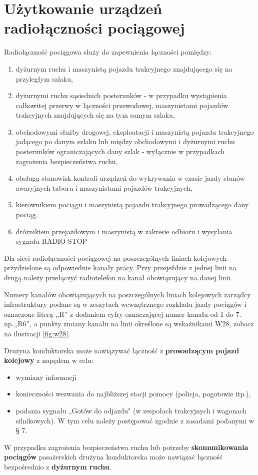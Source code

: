 \chapter{Użytkowanie urządzeń radiołączności pociągowej}


Radiołączność pociągowa służy do zapewnienia łączności pomiędzy:
\begin{enumerate}
\item dyżurnym ruchu i maszynistą pojazdu trakcyjnego znajdującego się na przyległym szlaku,
\item dyżurnymi ruchu sąsiednich posterunków - w przypadku wystąpienia całkowitej przerwy w łączności przewodowej, maszynistami pojazdów trakcyjnych znajdujących się na tym samym szlaku,
\item obchodowymi służby drogowej, eksploatacji i maszynistą pojazdu trakcyjnego jadącego po danym szlaku lub między obchodowymi i dyżurnymi
ruchu posterunków ograniczających dany szlak - wyłącznie w przypadkach zagrożenia bezpieczeństwa ruchu,
\item obsługą stanowisk kontroli urządzeń do wykrywania w czasie jazdy stanów awaryjnych taboru i maszynistami pojazdów trakcyjnych,
\item kierownikiem pociągu i maszynistą pojazdu trakcyjnego prowadzącego dany pociąg.
\item dróżnikiem przejazdowym i maszynistą w zakresie odbioru i wysyłania sygnału RADIO-STOP
\end{enumerate}

Dla sieci radiołączności pociągowej na poszczególnych liniach kolejowych przydzielone są odpowiednie kanały pracy. Przy przejeździe z jednej linii na drugą należy przełączyć radiotelefon na kanał obowiązujący na danej linii.

Numery kanałów obowiązujących na poszczególnych liniach kolejowych zarządcy infrastruktury podane są w zeszytach wewnętrznego rozkładu jazdy
pociągów i oznaczone literą ,,R'' z dodaniem cyfry oznaczającej numer kanału od 1 do 7. np.,,R6'', a punkty zmiany kanału na linii określone są wskaźnikami W28, zobacz na ilustracji \ref{fig:w28}.

Drużyna konduktorska może nawiązywać łączność z \textbf{prowadzącym pojazd kolejowy} z napędem w celu:
\begin{itemize}
	\item wymiany informacji
	\item konieczności wezwania do najbliższej stacji pomocy (policja, pogotowie itp.),
	\item podania sygnału „Gotów do odjazdu" (w zespołach trakcyjnych i wagonach silnikowych). W tym celu należy postępować zgodnie
	z zasadami podanymi w § 7.
\end{itemize}
W przypadku zagrożenia bezpieczeństwa ruchu lub potrzeby \textbf{skomunikowania pociągów} pasażerskich drużyna konduktorska może nawiązać łączność bezpośrednio z \textbf{dyżurnym ruchu}. 


